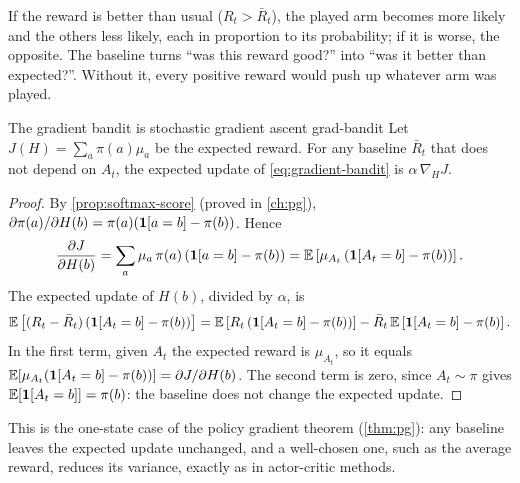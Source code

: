\begin{intuition}
  If the reward is better than usual ($R_t > \bar R_t$), the played arm
  becomes more likely and the others less likely, each in proportion to its
  probability; if it is worse, the opposite. The baseline turns ``was this
  reward good?'' into ``was it better than expected?''. Without it, every
  positive reward would push up whatever arm was played.
\end{intuition}

\begin{proposition}{The gradient bandit is stochastic gradient ascent}%
  {grad-bandit}
  Let $J(H) = \sum_a \pi(a) \mu_a$ be the expected reward. For any
  baseline $\bar R_t$ that does not depend on $A_t$, the expected update of
  \eqref{eq:gradient-bandit} is $\alpha\, \nabla_H J$.
\end{proposition}

\begin{proof}
  By \cref{prop:softmax-score} (proved in \cref{ch:pg}),
  $\partial \pi(a) / \partial H(b) = \pi(a) (\mathbf{1}[a = b] - \pi(b))$.
  Hence
  \begin{equation*}
    \frac{\partial J}{\partial H(b)} = \sum_a \mu_a\, \pi(a) \left(
    \mathbf{1}[a = b] - \pi(b) \right)
    = \mathbb{E}\left[ \mu_{A_t} \left( \mathbf{1}[A_t = b] - \pi(b) \right)
    \right].
  \end{equation*}
  The expected update of $H(b)$, divided by $\alpha$, is
  \begin{equation*}
    \mathbb{E}\left[ (R_t - \bar R_t) \left( \mathbf{1}[A_t = b] - \pi(b) \right)
    \right] = \mathbb{E}\left[ R_t \left( \mathbf{1}[A_t = b] - \pi(b) \right) \right] -
    \bar R_t\, \mathbb{E}\left[ \mathbf{1}[A_t = b] - \pi(b) \right].
  \end{equation*}
  In the first term, given $A_t$ the expected reward is $\mu_{A_t}$, so it
  equals $\mathbb{E}[\mu_{A_t} (\mathbf{1}[A_t = b] - \pi(b))] = \partial J / \partial
  H(b)$. The second term is zero, since $A_t \sim \pi$ gives
  $\mathbb{E}[\mathbf{1}[A_t = b]] = \pi(b)$: the baseline does not change the expected
  update.
\end{proof}

This is the one-state case of the policy gradient theorem
(\cref{thm:pg}): any baseline leaves the expected update unchanged, and a
well-chosen one, such as the average reward, reduces its variance, exactly
as in actor-critic methods.

